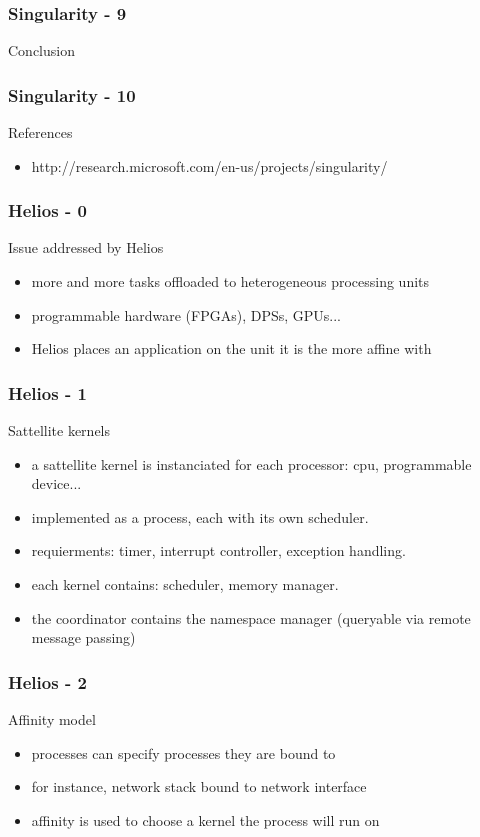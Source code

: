 \begin{frame}
  \frametitle{Singularity - 9}
  Conclusion
\end{frame}


\begin{frame}
  \frametitle{Singularity - 10}
  References
  \begin{itemize}
    \item http://research.microsoft.com/en-us/projects/singularity/
  \end{itemize}
\end{frame}



\begin{frame}
\frametitle{Helios - 0}
Issue addressed by Helios
\begin{itemize}
 \item more and more tasks offloaded to heterogeneous processing units
 \item programmable hardware (FPGAs), DPSs, GPUs...
 \item Helios places an application on the unit it is the more affine with
\end{itemize}
\end{frame}


\begin{frame}
\frametitle{Helios - 1}
Sattellite kernels
\begin{itemize}
 \item a sattellite kernel is instanciated for each processor: cpu, programmable device...
 \item implemented as a process, each with its own scheduler.
 \item requierments: timer, interrupt controller, exception handling.
 \item each kernel contains: scheduler, memory manager.
 \item the coordinator contains the namespace manager (queryable via remote message passing)
\end{itemize}
\end{frame}


\begin{frame}
\frametitle{Helios - 2}
Affinity model
  \begin{itemize}
    \item processes can specify processes they are bound to
    \item for instance, network stack bound to network interface 
    \item affinity is used to choose a kernel the process will run on
  \end{itemize}
\end{frame}


